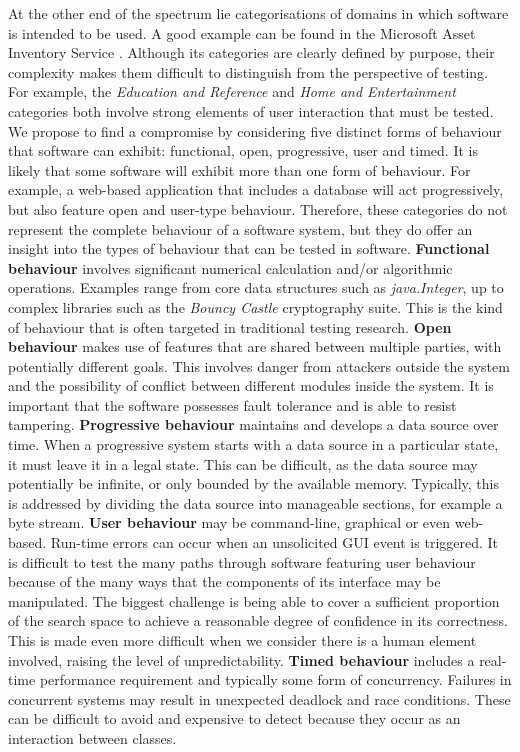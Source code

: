 \documentclass[runningheads,a4paper]{llncs}
\begin{document}
At the other end of the spectrum lie categorisations of domains in which software is intended to be used. A good example can be found in the Microsoft Asset Inventory Service \cite{microsoft_2010}. Although its categories are clearly defined by purpose, their complexity makes them difficult to distinguish from the perspective of testing. For example, the \emph{Education and Reference} and \emph{Home and Entertainment} categories both involve strong elements of user interaction that must be tested. We propose to find a compromise by considering five distinct forms of behaviour that software can exhibit: functional, open, progressive, user and timed. It is likely that some software will exhibit more than one form of behaviour. For example, a web-based application that includes a database will act progressively, but also feature open and user-type behaviour. Therefore, these categories do not represent the complete behaviour of a software system, but they do offer an insight into the types of behaviour that can be tested in software.
\newline
\textbf{Functional behaviour} involves significant numerical calculation and/or algorithmic operations. Examples range from core data structures such as \emph{java.Integer}, up to complex libraries such as the \emph{Bouncy Castle} cryptography suite. This is the kind of behaviour that is often targeted in traditional testing research.
\newline
\textbf{Open behaviour} makes use of features that are shared between multiple parties, with potentially different goals. This involves danger from attackers outside the system and the possibility of conflict between different modules inside the system. It is important that the software possesses fault tolerance and is able to resist tampering.
\newline
\textbf{Progressive behaviour} maintains and develops a data source over time. When a progressive system starts with a data source in a particular state, it must leave it in a legal state. This can be difficult, as the data source may potentially be infinite, or only bounded by the available memory. Typically, this is addressed by dividing the data source into manageable sections, for example a byte stream.
\newline
\textbf{User behaviour} may be command-line, graphical or even web-based. Run-time errors can occur when an unsolicited GUI event is triggered. It is difficult to test the many paths through software featuring user behaviour because of the many ways that the components of its interface may be manipulated. The biggest challenge is being able to cover a sufficient proportion of the search space to achieve a reasonable degree of confidence in its correctness. This is made even more difficult when we consider there is a human element involved, raising the level of unpredictability.
\newline
\textbf{Timed behaviour} includes a real-time performance requirement and typically some form of concurrency. Failures in concurrent systems may result in unexpected deadlock and race conditions. These can be difficult to avoid and expensive to detect because they occur as an interaction between classes.
\end{document}
